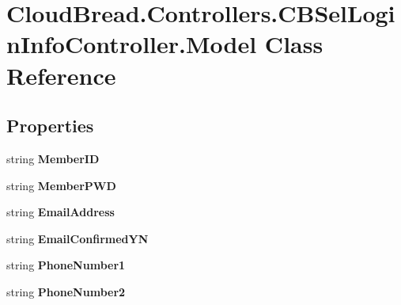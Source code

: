 \hypertarget{a00150}{}\section{Cloud\+Bread.\+Controllers.\+C\+B\+Sel\+Login\+Info\+Controller.\+Model Class Reference}
\label{a00150}
\subsection*{Properties}
\begin{DoxyCompactItemize}
\item 
string {\bfseries Member\+ID}\hypertarget{a00150_a7744dfc5bc4b1ae4889076e6ebf6ca07}{}\label{a00150_a7744dfc5bc4b1ae4889076e6ebf6ca07}

\item 
string {\bfseries Member\+P\+WD}\hypertarget{a00150_ad2269bb564a85491d0b3946299a38567}{}\label{a00150_ad2269bb564a85491d0b3946299a38567}

\item 
string {\bfseries Email\+Address}\hypertarget{a00150_a028c37ec277c76b747489025ee15fdf2}{}\label{a00150_a028c37ec277c76b747489025ee15fdf2}

\item 
string {\bfseries Email\+Confirmed\+YN}\hypertarget{a00150_a09151ce2c59e8d045990775761baad20}{}\label{a00150_a09151ce2c59e8d045990775761baad20}

\item 
string {\bfseries Phone\+Number1}\hypertarget{a00150_a318dcd20fbee30cac921f76e57d9defd}{}\label{a00150_a318dcd20fbee30cac921f76e57d9defd}

\item 
string {\bfseries Phone\+Number2}\hypertarget{a00150_a5bdfb9e068be38761d50de570f2e7499}{}\label{a00150_a5bdfb9e068be38761d50de570f2e7499}


\end{DoxyCompactItemize}
